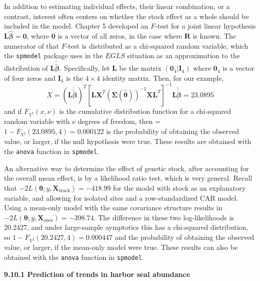 \documentclass[12pt, titlepage]{article}
\begin{document}
In addition to estimating individual effects, their linear combination, or a contrast, interest often centers on whether the stock effect as a whole should be included in the model.  Chapter 5 developed an $F$-test for a joint linear hypothesis $\mathbf{L}\hat{\boldsymbol{\beta}} = \mathbf{0}$, where $\mathbf{0}$ is a vector of all zeros, in the case where $\mathbf{R}$ is known.  The numerator of that $F$-test is distributed as a chi-squared random variable, which the \texttt{spmodel} package uses  in the $EGLS$ situation as an approximation to the distribution of $\mathbf{L}\tilde{\tilde{\boldsymbol{\beta}}}$.  Specifically, let $\mathbf{L}$ be the matrix $(\mathbf{0}_{4}|\mathbf{I}_{4})$ where $\mathbf{0}_{4}$ is a vector of four zeros and $\mathbf{I}_{4}$ is the $4 \times 4$ identity matrix.  Then, for our example,
$$
X = (\mathbf{L}\tilde{\tilde{\boldsymbol{\beta}}})^{T}
[\mathbf{L}\mathbf{X}^{T}(\boldsymbol{\Sigma}(\hat{\boldsymbol{\theta}}))^{-1}\mathbf{X}\mathbf{L}^{T}]^{-1}\mathbf{L}\tilde{\tilde{\boldsymbol{\beta}}} = 23.0895
$$
and if $F_{\chi^{2}}(x,\nu)$ is the cumulative distribution function for a chi-squared random variable with $\nu$ degrees of freedom, then = $1 - F_{\chi^{2}}(23.0895,4) = 0.000122$ is the probability of obtaining the observed value, or larger, if the null hypothesis were true.  These results are obtained with the \texttt{anova} function in \texttt{spmodel}.

An alternative way to determine the effect of genetic stock, after accounting for the overall mean effect, is by a likelihood ratio test, which is very general.  Recall that $-2L(\boldsymbol{\theta};y,\mathbf{X}_{\textrm{stock}}) = -418.99$ for the model with stock as an explanatory variable, and allowing for isolated sites and a row-standardized CAR model. Using a mean-only model with the same covariance structure results in $-2L(\boldsymbol{\theta};y,\mathbf{X}_{\textrm{ones}}) = -398.74$. The difference in these two log-likelihoods is 20.2427, and under large-sample aymptotics this has a chi-squared distribution, so  $1 - F_{\chi^{2}}(20.2427,4) = 0.000447$ and the probability of obtaining the observed value, or larger, if the mean-only model were true.  These results can also be obtained with the \texttt{anova} function in \texttt{spmodel}.




\vspace{.3cm}

{\large \flushleft \textbf{9.10.1 Prediction of trends in harbor seal abundance}}
\end{document}
